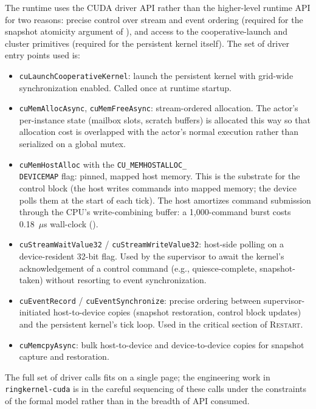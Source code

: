 The runtime uses the CUDA driver API rather than the higher-level
runtime API for two reasons: precise control over stream and event
ordering (required for the snapshot atomicity argument of
), and access to the cooperative-launch
and cluster primitives (required for the persistent kernel itself).
The set of driver entry points used is:

\begin{itemize}
\item \texttt{cuLaunchCooperativeKernel}: launch the persistent
kernel with grid-wide synchronization enabled. Called once at
runtime startup.

\item \texttt{cuMemAllocAsync}, \texttt{cuMemFreeAsync}: stream-ordered
allocation. The actor's per-instance state (mailbox slots,
scratch buffers) is allocated this way so that allocation cost is
overlapped with the actor's normal execution rather than serialized
on a global mutex.

\item \texttt{cuMemHostAlloc} with the \texttt{CU\_MEMHOSTALLOC\_\\
DEVICEMAP} flag: pinned, mapped host memory. This is the substrate
for the control block (the host writes commands into mapped memory;
the device polls them at the start of each tick).  The host
amortizes command submission through the CPU's write-combining
buffer: a 1{,}000-command burst costs 0.18~$\mu$s wall-clock
().

\item \texttt{cuStreamWaitValue32} / \texttt{cuStreamWriteValue32}:
host-side polling on a device-resident 32-bit flag. Used by the
supervisor to await the kernel's acknowledgement of a control
command (e.g., quiesce-complete, snapshot-taken) without resorting
to event synchronization.

\item \texttt{cuEventRecord} / \texttt{cuEventSynchronize}: precise
ordering between supervisor-initiated host-to-device copies (snapshot
restoration, control block updates) and the persistent kernel's tick
loop. Used in the critical section of \textsc{Restart}.

\item \texttt{cuMemcpyAsync}: bulk host-to-device and device-to-device
copies for snapshot capture and restoration.
\end{itemize}

The full set of driver calls fits on a single page; the engineering
work in \texttt{ringkernel-cuda} is in the careful sequencing of
these calls under the constraints of the formal model rather than
in the breadth of API consumed.


